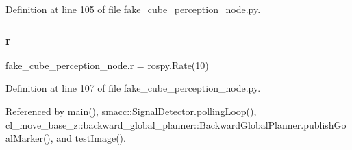 Definition at line 105 of file fake\+\_\+cube\+\_\+perception\+\_\+node.\+py.

\mbox{\label{namespacefake__cube__perception__node_a36e88703ab69fd35065e8a8d9344903e}} 
\subsubsection{\texorpdfstring{r}{r}}
{\footnotesize\ttfamily fake\+\_\+cube\+\_\+perception\+\_\+node.\+r = rospy.\+Rate(10)}



Definition at line 107 of file fake\+\_\+cube\+\_\+perception\+\_\+node.\+py.



Referenced by main(), smacc\+::\+Signal\+Detector.\+polling\+Loop(), cl\+\_\+move\+\_\+base\+\_\+z\+::backward\+\_\+global\+\_\+planner\+::\+Backward\+Global\+Planner.\+publish\+Goal\+Marker(), and test\+Image().


